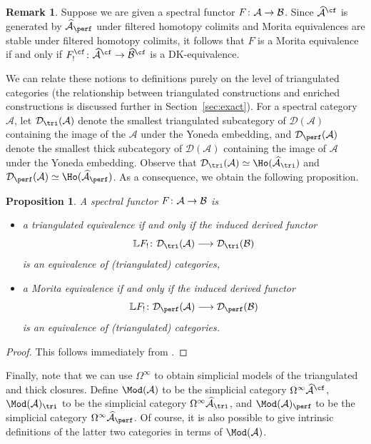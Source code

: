 \documentclass{amsart}
\renewcommand{\to}{\mathchoice{\longrightarrow}{\rightarrow}{\rightarrow}{\rightarrow}}
\newcommand{\cA}{{\mathcal A}}
\newcommand{\cD}{{\mathcal D}}
\let\catsymbfont\mathcal
\newcommand{\aA}{{\catsymbfont{A}}}
\newcommand{\aB}{{\catsymbfont{B}}}
\newcommand{\bL}{\mathbb{L}}
\newcommand{\too}{\longrightarrow}%
\renewcommand{\i}{\infty}
\numberwithin{equation}{section}
\newtheorem{proposition}[equation]{Proposition}
\theoremstyle{definition}
\newtheorem{remark}[equation]{Remark}
\begin{document}
\begin{remark}
Suppose we are given a spectral functor $F\colon \aA\to\aB$.  Since
$\widehat{\aA}^{\cf}$ is generated by $\widehat{\aA}_{\perf}$ under
filtered homotopy colimits and Morita equivalences are stable under
filtered homotopy colimits, it follows that $F$ is a Morita
equivalence if and only if 
$F_!^{\cf}\colon\widehat{\aA}^{\cf}\to\widehat{\aB}^{\cf}$ is a
DK-equivalence.
\end{remark}

We can relate these notions to definitions purely on the level of
triangulated categories (the relationship between triangulated
constructions and enriched constructions is discussed further in
Section~\ref{sec:exact}).  For a spectral category $\aA$, let
$\cD_{\tri}(\aA)$ denote the smallest triangulated subcategory of
$\cD(\cA)$ containing the image of the $\aA$ under the Yoneda
embedding, and $\cD_{\perf}(\aA)$ denote the smallest thick
subcategory of $\cD(\cA)$ containing the image of $\aA$ under the
Yoneda embedding.  Observe that
$\cD_{\tri}(\aA)\simeq\Ho(\widehat{\aA}_{\tri})$ and
$\cD_{\perf}(\aA)\simeq\Ho(\widehat{\aA}_{\perf})$.  As a consequence,
we obtain the following proposition.

\begin{proposition}\label{prop:Morita}
A spectral functor $F\colon \aA \to \aB$ is

\begin{itemize}
\item a triangulated equivalence if and only if the induced derived functor
\[
\bL F_!\colon \cD_{\tri}(\aA) \to \cD_{\tri}(\aB)
\]
is an equivalence of (triangulated) categories,

\item a Morita equivalence if and only if the induced derived functor
\[
\bL F_!\colon \cD_{\perf}(\aA) \too \cD_{\perf}(\aB)
\]
is an equivalence of (triangulated) categories.
\end{itemize}
\end{proposition}

\begin{proof}
This follows immediately from \cite[5.7]{BM2}.
\end{proof} 

Finally, note that we can use $\Omega^\i$ to obtain simplicial models
of the triangulated and thick closures.  Define $\Mod(\aA)$ to be the
simplicial category $\Omega^\i \widehat{\aA}^{\cf}$, $\Mod(\aA)_{\tri}$ to
be the simplicial category $\Omega^\i \widehat{\aA}_{\tri}$, and
$\Mod(\aA)_{\perf}$ to be the simplicial category
$\Omega^\i \widehat{\aA}_{\perf}$.  Of course, it is also possible to
give intrinsic definitions of the latter two categories in terms of
$\Mod(\aA)$.
\end{document}
